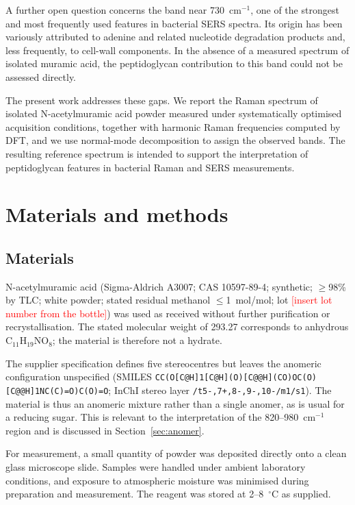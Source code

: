 \documentclass[11pt,a4paper]{article}
\newcommand{\wn}{\ensuremath{\mathrm{cm}^{-1}}}
\newcommand{\authorcheck}[1]{\textcolor{red}{[#1]}}
\begin{document}
A further open question concerns the band near 730~\wn{}, one of the
strongest and most frequently used features in bacterial SERS spectra. Its
origin has been variously attributed to adenine and related nucleotide
degradation products \cite{premasiri2016origins,kubryk2016origin} and, less
frequently, to cell-wall components. In the absence of a measured spectrum
of isolated muramic acid, the peptidoglycan contribution to this band could
not be assessed directly.

The present work addresses these gaps. We report the Raman spectrum of
isolated N-acetylmuramic acid powder measured under systematically
optimised acquisition conditions, together with harmonic Raman frequencies
computed by DFT, and we use normal-mode decomposition to assign the observed
bands. The resulting reference spectrum is intended to support the
interpretation of peptidoglycan features in bacterial Raman and SERS
measurements.

\section{Materials and methods}

\subsection{Materials}

N-acetylmuramic acid (Sigma-Aldrich A3007; CAS 10597-89-4; synthetic;
$\geq$98\% by TLC; white powder; stated residual methanol $\leq$1~mol/mol;
lot \authorcheck{insert lot number from the bottle}) was used as received
without further purification or recrystallisation. The stated molecular weight
of 293.27 corresponds to anhydrous C$_{11}$H$_{19}$NO$_8$; the material is
therefore not a hydrate.

The supplier specification defines five stereocentres but leaves the anomeric
configuration unspecified (SMILES
\texttt{CC(O[C@H]1[C@H](O)[C@@H](CO)OC(O)[C@@H]1NC(C)=O)C(O)=O};
InChI stereo layer \texttt{/t5-,7+,8-,9-,10-/m1/s1}). The material is thus an
anomeric mixture rather than a single anomer, as is usual for a reducing sugar.
This is relevant to the interpretation of the 820--980~\wn{} region and is
discussed in Section~\ref{sec:anomer}.

For measurement, a small quantity of powder was deposited directly onto a clean
glass microscope slide. Samples were handled under ambient laboratory
conditions, and exposure to atmospheric moisture was minimised during
preparation and measurement. The reagent was stored at 2--8~$^\circ$C as
supplied.
\end{document}
